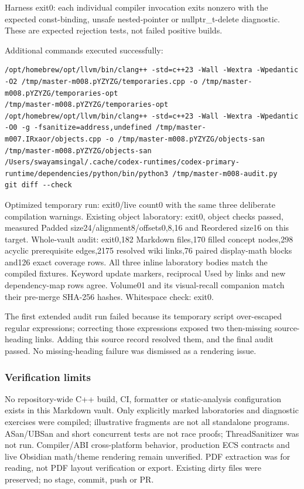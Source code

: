 Harness exit0: each individual compiler invocation exits nonzero with the expected const-binding, unsafe nested-pointer or nullptr\_t-delete diagnostic. These are expected rejection tests, not failed positive builds.

Additional commands executed successfully:

\begin{verbatim}
/opt/homebrew/opt/llvm/bin/clang++ -std=c++23 -Wall -Wextra -Wpedantic -O2 /tmp/master-m008.pYZYZG/temporaries.cpp -o /tmp/master-m008.pYZYZG/temporaries-opt
/tmp/master-m008.pYZYZG/temporaries-opt
/opt/homebrew/opt/llvm/bin/clang++ -std=c++23 -Wall -Wextra -Wpedantic -O0 -g -fsanitize=address,undefined /tmp/master-m007.IRxaor/objects.cpp -o /tmp/master-m008.pYZYZG/objects-san
/tmp/master-m008.pYZYZG/objects-san
/Users/swayamsingal/.cache/codex-runtimes/codex-primary-runtime/dependencies/python/bin/python3 /tmp/master-m008-audit.py
git diff --check
\end{verbatim}

Optimized temporary run: exit0/live count0 with the same three deliberate compilation warnings. Existing object laboratory: exit0, object checks passed, measured Padded size24/alignment8/offsets0,8,16 and Reordered size16 on this target. Whole-vault audit: exit0,182 Markdown files,170 filled concept nodes,298 acyclic prerequisite edges,2175 resolved wiki links,76 paired display-math blocks and126 exact coverage rows. All three inline laboratory bodies match the compiled fixtures. Keyword update markers, reciprocal Used by links and new dependency-map rows agree. Volume01 and its visual-recall companion match their pre-merge SHA-256 hashes. Whitespace check: exit0.

The first extended audit run failed because its temporary script over-escaped regular expressions; correcting those expressions exposed two then-missing source-heading links. Adding this source record resolved them, and the final audit passed. No missing-heading failure was dismissed as a rendering issue.

\subsubsection{Verification limits}\label{appendix-a103e7846d21-verification-limits}

No repository-wide C++ build, CI, formatter or static-analysis configuration exists in this Markdown vault. Only explicitly marked laboratories and diagnostic exercises were compiled; illustrative fragments are not all standalone programs. ASan/UBSan and short concurrent tests are not race proofs; ThreadSanitizer was not run. Compiler/ABI cross-platform behavior, production ECS contracts and live Obsidian math/theme rendering remain unverified. PDF extraction was for reading, not PDF layout verification or export. Existing dirty files were preserved; no stage, commit, push or PR.

